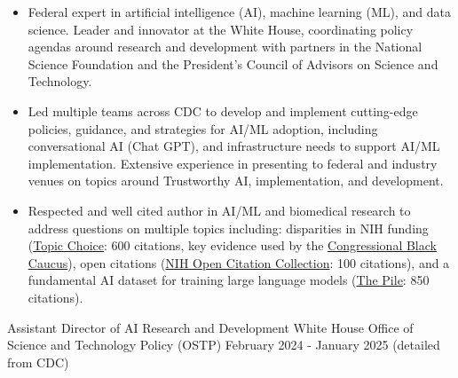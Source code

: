 \documentclass[]{scrartcl}
\begin{document}
\begin{cleanCV}

   \vspace{-1em}

   {
  \vspace{-1.5em}
  \begin{itemize}

  \item Federal expert in artificial intelligence (AI), machine learning (ML), and data science. Leader and innovator at the White House, coordinating policy agendas around research and development with partners in the National Science Foundation and the President's Council of Advisors on Science and Technology.
  \item Led multiple teams across CDC to develop and implement cutting-edge policies, guidance, and strategies for AI/ML adoption, including conversational AI (Chat GPT), and infrastructure needs to support AI/ML implementation. Extensive experience in presenting to federal and industry venues on topics around Trustworthy AI, implementation, and development. 
   \item Respected and well cited author in AI/ML and biomedical research to address questions on multiple topics including: disparities in NIH funding (\href{https://www.science.org/doi/10.1126/sciadv.aaw7238}{Topic Choice}: 600 citations, key evidence used by the \href{https://bluntrochester.house.gov/uploadedfiles/191220_ltr_to_nih_about_grant_disparities.pdf}{Congressional Black Caucus}), open citations (\href{https://www.ncbi.nlm.nih.gov/pmc/articles/PMC6786512/}{NIH Open Citation Collection}: 100 citations), and a fundamental AI dataset for training large language models (\href{https://arxiv.org/abs/2101.00027}{The Pile}: 850 citations).

  \end{itemize}
}

  \vspace{-1em}

\WorkExperience
{}
{Assistant Director of AI Research and Development}
{
  \newline White House Office of Science and Technology Policy (OSTP)
  \newline February 2024 - January 2025 (detailed from CDC)
}
{
  \vspace{-0.25em}
  \begin{itemize}


\end{itemize}}
\end{cleanCV}
\end{document}
